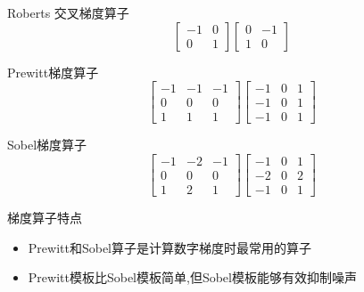 \documentclass[presentation]{beamer}
\begin{document}
\begin{frame}[label={sec:org335a5f1}]{Roberts 交叉梯度算子}
\[\begin{bmatrix}
           -1 & 0  \\
            0 & 1 \end{bmatrix}
           \begin{bmatrix}
            0 & -1 \\
           1 &  0 \end{bmatrix}\]
\end{frame}
\begin{frame}[label={sec:orga21493e}]{Prewitt梯度算子}
\[\begin{bmatrix}
           -1 & -1 & -1 \\
            0 &  0 &  0 \\
            1 &  1 &  1 \end{bmatrix}
           \begin{bmatrix}
           -1 &  0 &  1 \\
           -1 &  0 &  1 \\
           -1 &  0 &  1 \end{bmatrix}\]
\end{frame}
\begin{frame}[label={sec:orgebee143}]{Sobel梯度算子}
\[\begin{bmatrix}
           -1 & -2 & -1 \\
            0 &  0 &  0 \\
            1 &  2 &  1 \end{bmatrix}
           \begin{bmatrix}
           -1 &  0 &  1 \\
           -2 &  0 &  2 \\
           -1 &  0 &  1 \end{bmatrix}\]
\end{frame}

\begin{frame}[label={sec:orge7f7dd1}]{梯度算子特点}
\begin{itemize}
\item Prewitt和Sobel算子是计算数字梯度时最常用的算子
\item Prewitt模板比Sobel模板简单,但Sobel模板能够有效抑制噪声
\end{itemize}
\end{frame}
\end{document}
